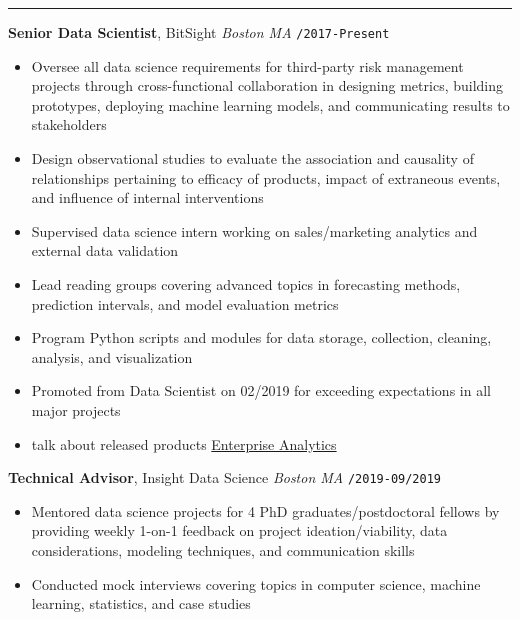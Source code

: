 \documentclass[10pt,english]{report}
\begin{document}
\vspace{5mm}

{\par}
\vspace{1mm}\hrule
\vspace{1mm}

\textbf{Senior Data Scientist}, BitSight \hfill \textit{Boston MA} \texttt{/2017-Present}
\begin{itemize}
\item Oversee all data science requirements for third-party risk management projects through cross-functional collaboration in designing metrics, building prototypes, deploying machine learning models, and communicating results to stakeholders
\item Design observational studies to evaluate the association and causality of relationships pertaining to efficacy of products, impact of extraneous events, and influence of internal interventions
\item Supervised data science intern working on sales/marketing analytics and external data validation
\item Lead reading groups covering advanced topics in forecasting methods, prediction intervals, and model evaluation metrics
\item Program Python scripts and modules for data storage, collection, cleaning, analysis, and visualization
\item Promoted from Data Scientist on 02/2019 for exceeding expectations in all major projects
\item talk about released products \href{https://www.bitsight.com/press-releases/bitsight-announces-enterprise-analytics-help-security-risk-leaders-manage-cyber-risk}{Enterprise Analytics}
\end{itemize}

\vspace{1mm}

\textbf{Technical Advisor}, Insight Data Science \hfill \textit{Boston MA} \texttt{/2019-09/2019}
\begin{itemize}
\item Mentored data science projects for 4 PhD graduates/postdoctoral fellows by providing weekly 1-on-1 feedback on project ideation/viability, data considerations, modeling techniques, and communication skills
\item Conducted mock interviews covering topics in computer science, machine learning, statistics, and case studies
\end{itemize}
\end{document}
